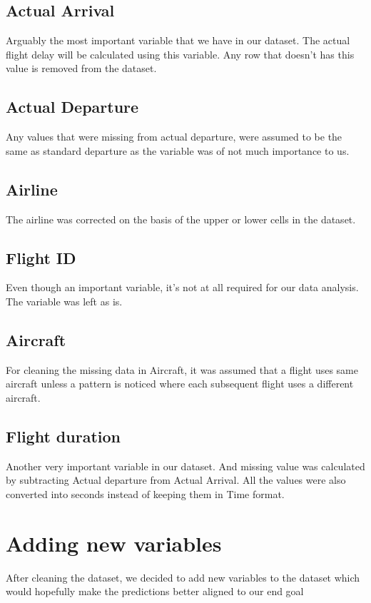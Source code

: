 \subsection{Actual Arrival}
Arguably the most important variable that we have in our dataset. The actual flight delay will be calculated using this variable. Any row that doesn't has this value is removed from the dataset.

\subsection{Actual Departure}
Any values that were missing from actual departure, were assumed to be the same as standard departure as the variable was of not much importance to us.
\subsection{Airline}
The airline was corrected on the basis of the upper or lower cells in the dataset. 

\subsection{Flight ID}
Even though an important variable, it's not at all required for our data analysis. The variable was left as is.

\subsection{Aircraft}
For cleaning the missing data in Aircraft, it was assumed that a flight uses same aircraft unless a pattern is noticed where each subsequent flight uses a different aircraft.

\subsection{Flight duration}
Another very important variable in our dataset. And missing value was calculated by subtracting Actual departure from Actual Arrival. All the values were also converted into seconds instead of keeping them in Time format.

\section{Adding new variables}
After cleaning the dataset, we decided to add new variables to the dataset which would hopefully make the predictions better aligned to our end goal

